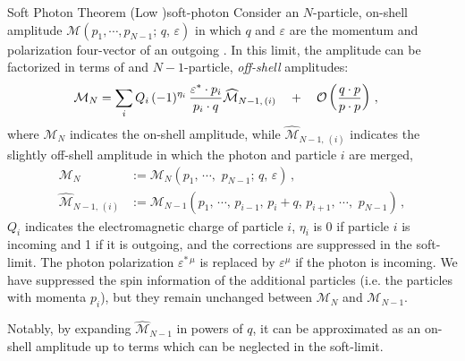 \begin{theorembox}{Soft Photon Theorem (Low \cite{Low:1958sn})}{soft-photon}
    Consider an \(N\)-particle, on-shell amplitude \(\mathcal{M}(p_1, \cdots, p_{N-1};\,q,\,\varepsilon)\) in which \(q\) and \(\varepsilon\) are the momentum and polarization four-vector of an outgoing .
    In this limit, the amplitude can be factorized in terms of  and \(N-1\)-particle, \textit{off-shell} amplitudes:
    \begin{equation}
    \begin{aligned}
        \mathcal{M}_N
        &=
        \sum_{i}
        Q_i
        \,
        (-1)^{\eta_i}
        \,
        \frac{\varepsilon^* \cdot p_i}{p_i \cdot q}
        \widehat{\mathcal{M}}_{N-1,\,(i)}
        \quad
        +
        \quad
        \mathcal{O}\left(\frac{q\cdot p}{p \cdot p}\right)
        \,,
    \end{aligned}
    \end{equation}
    where \(\mathcal{M}_N\) indicates the on-shell amplitude, while \(\widehat{\mathcal{M}}_{N-1,\,(i)}\) indicates the slightly off-shell amplitude in which the  photon and particle \(i\) are merged,
    \begin{align}
        \mathcal{M}_N
        &:=
        \mathcal{M}_N(p_1,\,\cdots,\,\,p_{N-1};\,q,\,\varepsilon)
        \,,
        \\
        \widehat{\mathcal{M}}_{N-1,\,(i)}
        &:=
        \mathcal{M}_{N-1}(
            p_1,\,\cdots,\,
            p_{i-1},\,
            p_i + q,\,
            p_{i+1},\,
            \cdots,\,\,p_{N-1}
        )
        \,,
    \end{align}
    \(Q_i\) indicates the electromagnetic charge of particle \(i\), \(\eta_i\) is 0 if particle \(i\) is incoming and 1 if it is outgoing, and the corrections are suppressed in the \gls{soft-limit}.
    The photon polarization \(\varepsilon^{*\,\mu}\) is replaced by \(\varepsilon^{\mu}\) if the photon is incoming.
    We have suppressed the spin information of the additional particles (i.e. the particles with momenta \(p_i\)), but they remain unchanged between \(\mathcal{M}_N\) and \(\mathcal{M}_{N-1}\).
\end{theorembox}

Notably, by expanding \(\widehat{\mathcal{M}}_{N-1}\) in powers of \(q\), it can be approximated as an on-shell amplitude up to terms which can be neglected in the \gls{soft-limit}.


